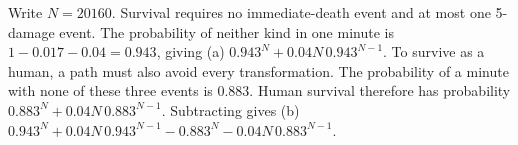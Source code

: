 Write $N=20160$. Survival requires no immediate-death event and at most one 5-damage event. The probability of neither kind in one minute is $1-0.017-0.04=0.943$, giving (a) $\boxed{0.943^N+0.04N\,0.943^{N-1}}$. To survive as a human, a path must also avoid every transformation. The probability of a minute with none of these three events is 0.883. Human survival therefore has probability $0.883^N+0.04N\,0.883^{N-1}$. Subtracting gives (b) $\boxed{0.943^N+0.04N\,0.943^{N-1}-0.883^N-0.04N\,0.883^{N-1}}$.
